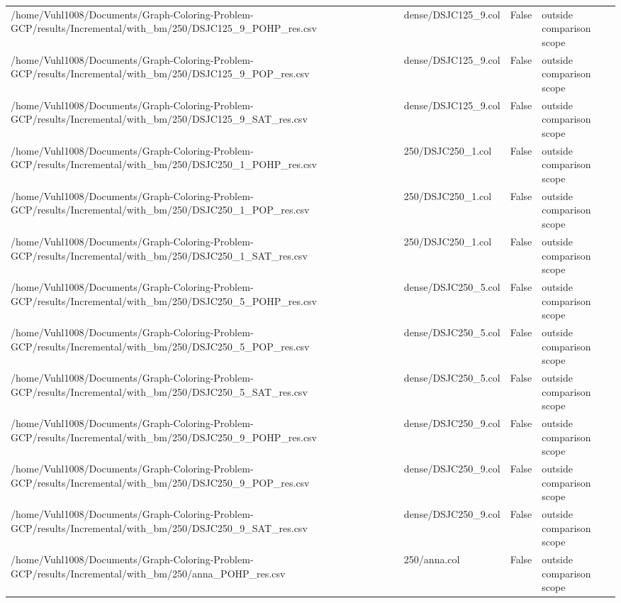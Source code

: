 \begin{table}[htbp]
\begin{tabular}{llll}
/home/Vuhl1008/Documents/Graph-Coloring-Problem-GCP/results/Incremental/with\_bm/250/DSJC125\_9\_POHP\_res.csv & dense/DSJC125\_9.col & False & outside comparison scope \\
/home/Vuhl1008/Documents/Graph-Coloring-Problem-GCP/results/Incremental/with\_bm/250/DSJC125\_9\_POP\_res.csv & dense/DSJC125\_9.col & False & outside comparison scope \\
/home/Vuhl1008/Documents/Graph-Coloring-Problem-GCP/results/Incremental/with\_bm/250/DSJC125\_9\_SAT\_res.csv & dense/DSJC125\_9.col & False & outside comparison scope \\
/home/Vuhl1008/Documents/Graph-Coloring-Problem-GCP/results/Incremental/with\_bm/250/DSJC250\_1\_POHP\_res.csv & 250/DSJC250\_1.col & False & outside comparison scope \\
/home/Vuhl1008/Documents/Graph-Coloring-Problem-GCP/results/Incremental/with\_bm/250/DSJC250\_1\_POP\_res.csv & 250/DSJC250\_1.col & False & outside comparison scope \\
/home/Vuhl1008/Documents/Graph-Coloring-Problem-GCP/results/Incremental/with\_bm/250/DSJC250\_1\_SAT\_res.csv & 250/DSJC250\_1.col & False & outside comparison scope \\
/home/Vuhl1008/Documents/Graph-Coloring-Problem-GCP/results/Incremental/with\_bm/250/DSJC250\_5\_POHP\_res.csv & dense/DSJC250\_5.col & False & outside comparison scope \\
/home/Vuhl1008/Documents/Graph-Coloring-Problem-GCP/results/Incremental/with\_bm/250/DSJC250\_5\_POP\_res.csv & dense/DSJC250\_5.col & False & outside comparison scope \\
/home/Vuhl1008/Documents/Graph-Coloring-Problem-GCP/results/Incremental/with\_bm/250/DSJC250\_5\_SAT\_res.csv & dense/DSJC250\_5.col & False & outside comparison scope \\
/home/Vuhl1008/Documents/Graph-Coloring-Problem-GCP/results/Incremental/with\_bm/250/DSJC250\_9\_POHP\_res.csv & dense/DSJC250\_9.col & False & outside comparison scope \\
/home/Vuhl1008/Documents/Graph-Coloring-Problem-GCP/results/Incremental/with\_bm/250/DSJC250\_9\_POP\_res.csv & dense/DSJC250\_9.col & False & outside comparison scope \\
/home/Vuhl1008/Documents/Graph-Coloring-Problem-GCP/results/Incremental/with\_bm/250/DSJC250\_9\_SAT\_res.csv & dense/DSJC250\_9.col & False & outside comparison scope \\
/home/Vuhl1008/Documents/Graph-Coloring-Problem-GCP/results/Incremental/with\_bm/250/anna\_POHP\_res.csv & 250/anna.col & False & outside comparison scope \\

\end{tabular}
\end{table}
